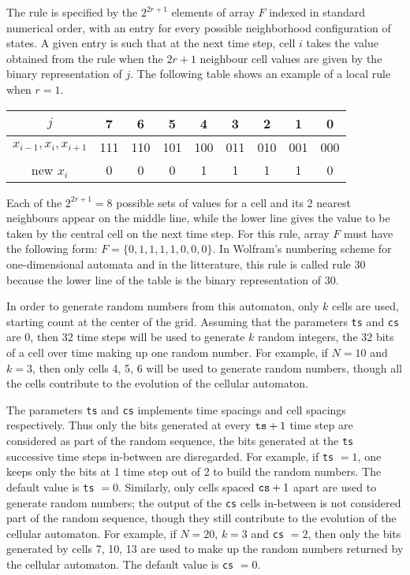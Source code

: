  The rule is specified by the $2^{2r + 1}$ elements
 of array $F$ indexed in standard numerical order, with an entry for
  every possible neighborhood configuration of states. A given entry is
 such that at the next time step, cell
 $i$ takes the value obtained from the rule when the $2r+1$ neighbour cell
 values are given by the binary representation of $j$. The following
 table  shows an example of a local rule when $r=1$.

\begin{center}
\begin{tabular}{|c|c|c|c|c|c|c|c|c|}\hline
   $j$                   & 7 & 6 & 5 & 4 & 3 & 2 & 1 & 0 \\ \hline
 $x_{i-1}, x_i, x_{i+1}$
       & 111 & 110 & 101 & 100 & 011  & 010 & 001 & 000 \\ \hline
    new $x_i$ & 0 & 0 & 0 & 1 & 1 & 1 & 1 & 0 \\ \hline 
\end{tabular}
\end{center}

 Each of the $2^{2r + 1} = 8$ possible sets of values for a cell and its
 2 nearest neighbours appear on the middle line, while the lower line
 gives the  value to be taken
 by the central cell on the next time step. For this rule, array $F$
 must have the following form: $F = \{ 0, 1, 1, 1, 1, 0, 0, 0 \}$.
 In Wolfram's numbering scheme for one-dimensional automata \cite{rWOL86a}
 and in the litterature, this rule is called rule 30 because the
 lower line of the table is the binary representation of 30.

 In order to generate random numbers from this automaton, only $k$ cells
 are used, starting count at the center of the grid. Assuming that
 the parameters
 {\tt ts}  and {\tt cs} are 0, then 32 time steps will be used
 to generate $k$  random integers, the 32 bits of a cell over time
 making up one random number. For example, if $N=10$ and $k=3$, then only
 cells 4, 5, 6 will be used to generate random numbers, though
 all the cells contribute to the evolution of the  cellular automaton.

 The parameters {\tt ts}  and {\tt cs} implements time spacings and cell
  spacings respectively. Thus only the bits generated at every ${\tt ts} + 1$
 time step are considered as part of the random sequence, the bits generated
 at the {\tt ts} successive time steps in-between are disregarded.
 For example, if  {\tt ts} $=1$, one keeps only the bits at 1 time step out
 of 2 to build the random numbers. The default value is {\tt ts} $=0$.
 Similarly, only cells spaced ${\tt cs} + 1$ apart are used to generate random
 numbers; the output of the {\tt cs} cells
 in-between is not considered part of the random sequence, though they still
 contribute to the evolution of the  cellular automaton.
 For example, if $N=20$, $k=3$ and  {\tt cs} $=2$, then only the bits
 generated by cells 7, 10, 13 are used to make up the random numbers
 returned by the cellular automaton. The default value is {\tt cs} $=0$.

